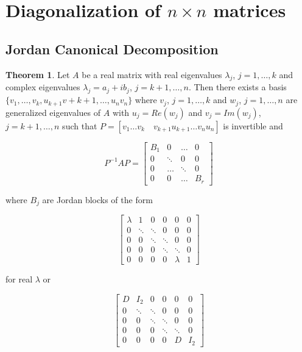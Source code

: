 \documentclass[12pt]{article}
\theoremstyle{definition}
\newtheorem{theorem}{Theorem}[section]  %
\begin{document}
\section{Diagonalization of $n \times n$ matrices}

\subsection{Jordan Canonical Decomposition}

\begin{theorem}
Let $A$ be a real matrix with real eigenvalues $\lambda_j$, $j = 1, \dots , k$ and complex eigenvalues 
$\lambda_j = a_j + ib_j$, $j = k+1, \ldots, n$. Then there exists a basis $\{v_1, \ldots, v_k, u_{k+1}v+{k+1}, \ldots, u_n v_n \}$
where $v_j$, $j = 1, \ldots, k$ and $w_j$, $j = 1, \ldots, n$ are generalized eigenvalues of $A$ with $u_j = Re(w_j)$
and $v_j = Im(w_j)$, $j = k+1, \ldots, n$ such that $P = [v_1 \ldots v_k \quad v_{k+1}u_{k+1} \ldots v_n u_n]$ is invertible
and 

\begin{equation*}
P^{-1} A P = 
\begin{bmatrix}
B_1 & 0 & \dots & 0 \\
0 & \ddots & 0 & 0 \\
0 & \dots & \ddots & 0 \\
0 & 0 & \dots & B_r
\end{bmatrix}
\end{equation*}
\end{theorem}

where $B_j$ are Jordan blocks of the form

\begin{equation*}
\begin{bmatrix}
\lambda & 1      & 0       &  0 & 0 & 0\\
0       & \ddots & \ddots  &  0 & 0 & 0 \\
0       & 0      & \ddots  & \ddots & 0  & 0\\
0       & 0      & 0       & \ddots &  \ddots & 0 \\
0       & 0      & 0       & 0       & \lambda & 1
\end{bmatrix}
\end{equation*}

for real $\lambda$ or

\begin{equation*}
\begin{bmatrix}
D       & I_2      & 0       &  0 & 0 & 0\\
0       & \ddots & \ddots  &  0 & 0 & 0 \\
0       & 0      & \ddots  & \ddots & 0  & 0\\
0       & 0      & 0       & \ddots &  \ddots & 0 \\
0       & 0      & 0       & 0       & D & I_2
\end{bmatrix}
\end{equation*}
\end{document}
